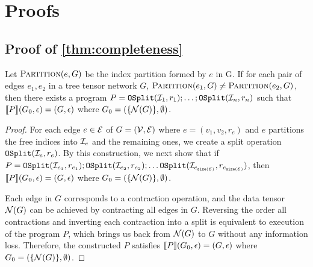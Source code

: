 \section{Proofs}\label{sec:appendix:proof}

\subsection{Proof of \cref{thm:completeness}}
\begin{lemma}\label{lemma:appendix:mapping}
Let $\textsc{Partition}(e, G)$ be the index partition formed by $e$ in G. If for each pair of edges $e_1, e_2$ in a tree tensor network $G$, $\textsc{Partition}(e_1,G) \not= \textsc{Partition}(e_2, G)$, then there exists a program $P = \mathtt{OSplit}(\mathcal{I}_1, r_1); \ldots; \mathtt{OSplit}(\mathcal{I}_n, r_n)$ such that $\llbracket P \rrbracket(G_0, \epsilon) = (G, \epsilon)$ where $G_0 = (\{\mathcal{N}(G)\}, \emptyset)$.
\end{lemma}
\begin{proof}
For each edge $e \in \mathcal{E}$ of $G = (\mathcal{V}, \mathcal{E})$ where $e = (v_1, v_2, r_e)$ and $e$ partitions the free indices into $\mathcal{I}_{e}$ and the remaining ones, we create a split operation $\mathtt{OSplit}(\mathcal{I}_{e}, r_e)$. By this construction, we next show that
if $P = \mathtt{OSplit}(\mathcal{I}_{e_1}, r_{e_1}); \mathtt{OSplit}(\mathcal{I}_{e_2}, r_{e_2}); \ldots \mathtt{OSplit}(\mathcal{I}_{e_{\mathtt{size}\left(\mathcal{E}\right)}}, r_{e_{\mathtt{size}\left(\mathcal{E}\right)}})$, then
$\llbracket P \rrbracket(G_0, \epsilon) = (G, \epsilon)$ where $G_0 = (\{\mathcal{N}(G)\}, \emptyset)$.

Each edge in $G$ corresponds to a contraction operation, and the data tensor $\mathcal{N}(G)$ can be achieved by contracting all edges in $G$.
%
Reversing the order all contractions and inverting each contraction into a split is equivalent to execution of the program $P$, which brings us back from $\mathcal{N}(G)$ to $G$ without any information loss.
%
Therefore, the constructed $P$ satisfies $\llbracket P \rrbracket(G_0, \epsilon) = (G, \epsilon)$ where $G_0 = (\{\mathcal{N}(G)\}, \emptyset)$.
\end{proof}

